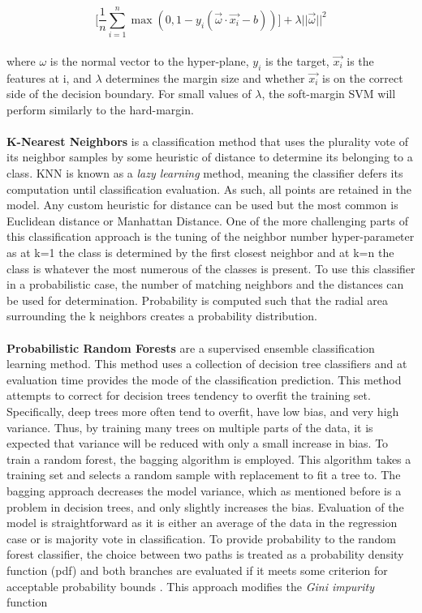 \begin{equation}
    \Big[ \frac{1}{n}\sum^n_{i=1}\max(0,1-y_i(\vec{\omega} \cdot \vec{x_i} - b))\Big] + \lambda ||\vec{\omega}||^2
\end{equation}
\\
where $\omega$ is the normal vector to the hyper-plane, $y_i$ is the target, $\vec{x_i}$ is the features at i, and $\lambda$ determines the margin size and whether $\vec{x_i}$ is on the correct side of the decision boundary. For small values of $\lambda$, the soft-margin SVM will perform similarly to the hard-margin.
\\
\\
\textbf{K-Nearest Neighbors} is a classification method that uses the plurality vote of its neighbor samples by some heuristic of distance to determine its belonging to a class. KNN is known as a \textit{lazy learning} method, meaning the classifier defers its computation until classification evaluation. As such, all points are retained in the model. Any custom heuristic for distance can be used but the most common is Euclidean distance or Manhattan Distance. One of the more challenging parts of this classification approach is the tuning of the neighbor number hyper-parameter as at k=1 the class is determined by the first closest neighbor and at k=n the class is whatever the most numerous of the classes is present. To use this classifier in a probabilistic case, the number of matching neighbors and the distances can be used for determination. Probability is computed such that the radial area surrounding the k neighbors creates a probability distribution. \cite{cheng-evaluating-2009}
\\
\\
\textbf{Probabilistic Random Forests} are a supervised ensemble classification learning method. This method uses a collection of decision tree classifiers and at evaluation time provides the mode of the classification prediction. This method attempts to correct for decision trees tendency to overfit the training set. Specifically, deep trees more often tend to overfit, have low bias, and very high variance. Thus, by training many trees on multiple parts of the data, it is expected that variance will be reduced with only a small increase in bias. To train a random forest, the bagging algorithm is employed. This algorithm takes a training set and selects a random sample with replacement to fit a tree to. The bagging approach decreases the model variance, which as mentioned before is a problem in decision trees, and only slightly increases the bias. Evaluation of the model is straightforward as it is either an average of the data in the regression case or is majority vote in classification. To provide probability to the random forest classifier, the choice between two paths is treated as a probability density function (pdf) and both branches are evaluated if it meets some criterion for acceptable probability bounds \cite{reis-probabilistic-2018}. This approach modifies the \textit{Gini impurity} function


